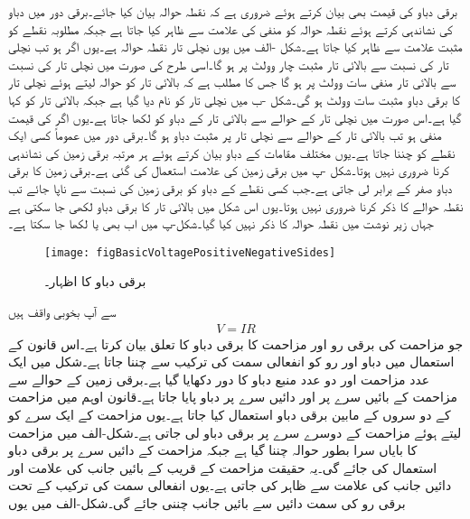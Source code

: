 برقی دباو کی قیمت بھی بیان کرتے ہوئے ضروری ہے کہ نقطہ حوالہ بیان کیا جائے۔برقی دور میں دباو کی نشاندہی کرتے ہوئے نقطہ حوالہ کو منفی کی علامت  سے ظاہر کیا جاتا ہے جبکہ مطلوبہ نقطے کو مثبت علامت  سے ظاہر کیا جاتا ہے۔شکل -الف میں یوں نچلی تار نقطہ حوالہ ہے۔یوں اگر  ہو تب نچلی تار کی نسبت سے بالائی تار مثبت چار وولٹ پر ہو گا۔اسی طرح  کی صورت میں نچلی تار کی نسبت سے بالائی تار منفی سات وولٹ پر ہو گا جس کا مطلب ہے کہ بالائی تار کو حوالہ لیتے ہوئے نچلی تار کا برقی دباو مثبت سات وولٹ ہو گی۔شکل  -ب میں نچلی تار کو  نام دیا گیا ہے جبکہ بالائی تار کو  کہا گیا ہے۔اس صورت میں نچلی تار کے حوالے سے بالائی تار کے دباو کو  لکھا جاتا ہے۔یوں اگر  کی قیمت منفی ہو تب بالائی تار کے حوالے سے نچلی تار پر مثبت دباو ہو گا۔برقی دور میں عموماً کسی ایک نقطے کو  چننا جاتا ہے۔یوں مختلف مقامات کے دباو بیان کرتے ہوئے ہر مرتبہ برقی زمین کی نشاندہی کرنا ضروری نہیں ہوتا۔شکل -پ میں برقی زمین کی علامت استعمال کی گئی ہے۔برقی زمین کا برقی دباو صفر کے برابر لی جاتی ہے۔جب کسی نقطے کے دباو کو برقی زمین کی نسبت سے ناپا جائے تب نقطہ حوالے کا ذکر کرنا ضروری نہیں ہوتا۔یوں اس شکل میں بالائی تار کا برقی دباو  لکھی جا سکتی ہے  جہاں زیر نوشت میں نقطہ حوالہ کا ذکر نہیں کیا گیا۔شکل-پ میں اب بھی  یا  لکھا جا سکتا ہے۔
\begin{figure}
\centering
\texttt{[image: figBasicVoltagePositiveNegativeSides]}
\caption{برقی دباو کا اظہار۔}
\label{شکل_بنیادی_دباو_کا_اظہار}
\end{figure}
%
 سے آپ بخوبی واقف ہیں
\begin{align}
V=I R
\end{align}
جو مزاحمت کی برقی رو اور مزاحمت کا برقی دباو کا تعلق بیان کرتا ہے۔اس قانون کے استعمال میں دباو  اور رو  کو انفعالی سمت کی ترکیب سے چننا جاتا ہے۔شکل  میں ایک عدد مزاحمت اور دو عدد منبع دباو کا دور دکھایا گیا ہے۔برقی زمین کے حوالے سے مزاحمت کے بائیں سرے پر  اور دائیں سرے پر  دباو پایا جاتا ہے۔قانون اوہم میں مزاحمت کے دو سروں کے مابین برقی دباو استعمال کیا جاتا ہے۔یوں مزاحمت کے ایک سرے کو  لیتے ہوئے مزاحمت کے دوسرے سرے پر برقی دباو لی جاتی ہے۔شکل-الف میں مزاحمت کا بایاں سرا بطور حوالہ چننا گیا ہے جبکہ مزاحمت کے دائیں سرے پر برقی دباو استعمال کی جائے گی۔یہ حقیقت مزاحمت کے قریب  کے بائیں جانب  کی علامت اور دائیں جانب   کی علامت سے ظاہر کی جاتی ہے۔یوں انفعالی سمت کی ترکیب کے تحت برقی رو کی سمت دائیں سے بائیں جانب چننی جائے گی۔شکل-الف میں یوں
